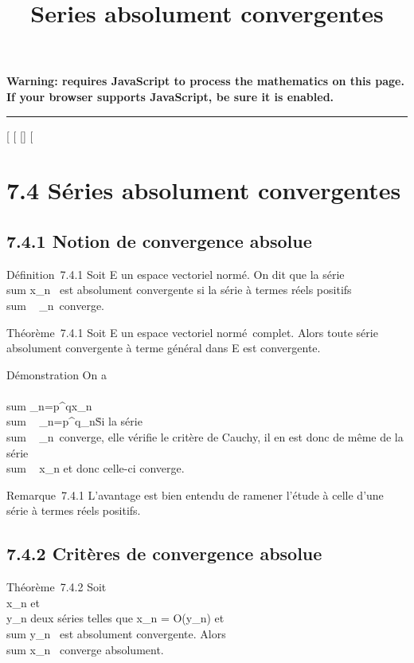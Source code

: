 \documentclass[]{article}
\title{Series absolument convergentes}
\author{}
\date{}
\begin{document}
\maketitle

\textbf{Warning: 
requires JavaScript to process the mathematics on this page.\\ If your
browser supports JavaScript, be sure it is enabled.}

\begin{center}\rule{3in}{0.4pt}\end{center}

[
[
[]
[

\section{7.4 Séries absolument convergentes}

\subsection{7.4.1 Notion de convergence absolue}

Définition~7.4.1 Soit E un espace vectoriel normé. On dit que la série
\\sum  x_n~ est
absolument convergente si la série à termes réels positifs
\\sum ~
\x_n\
converge.

Théorème~7.4.1 Soit E un espace vectoriel normé~complet. Alors toute
série absolument convergente à terme général dans E est convergente.

Démonstration On a
\\\\sum
 _n=p^qx_n\
\leq\\sum ~
_n=p^q\x_n\.
Si la série \\sum ~
\x_n\
converge, elle vérifie le critère de Cauchy, il en est donc de même de
la série \\sum ~
x_n et donc celle-ci converge.

Remarque~7.4.1 L'avantage est bien entendu de ramener l'étude à celle
d'une série à termes réels positifs.

\subsection{7.4.2 Critères de convergence absolue}

Théorème~7.4.2 Soit \\\sum
 x_n et \\\sum
 y_n deux séries telles que x_n = O(y_n)
et \\sum  y_n~
est absolument convergente. Alors
\\sum  x_n~
converge absolument.
\end{document}
